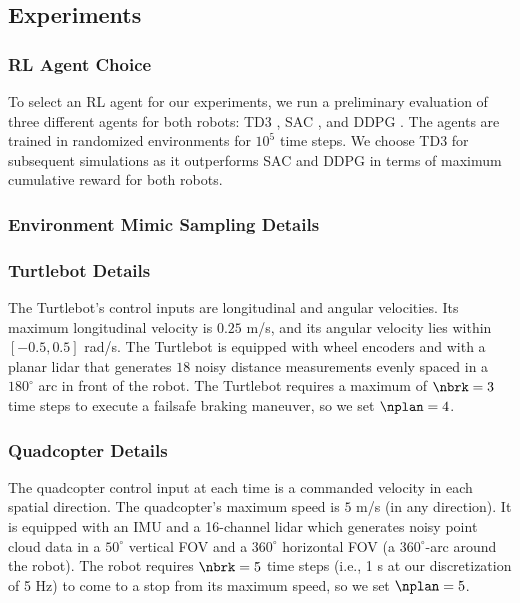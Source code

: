 \subsection{Experiments}

\subsubsection{RL Agent Choice}
To select an RL agent for our experiments, we run a preliminary evaluation of three different agents for both robots: TD3 \cite{conf:TD3}, SAC \cite{conf:SAC}, and DDPG \cite{conf:DDPG}.
The agents are trained in randomized environments for $10^5$ time steps.
We choose TD3 for subsequent simulations as it outperforms SAC and DDPG in terms of maximum cumulative reward for both robots.


\subsubsection{Environment Mimic Sampling Details}



\subsubsection{Turtlebot Details}

The Turtlebot's control inputs are longitudinal and angular velocities.
Its maximum longitudinal velocity is $0.25$ m/s, and its angular velocity lies within $[-0.5, 0.5]$ rad/s.
The Turtlebot is equipped with wheel encoders and with a planar lidar that generates $18$ noisy distance measurements evenly spaced in a $180^\circ$ arc in front of the robot.
The Turtlebot requires a maximum of  $\nbrk = 3$ time steps to execute a failsafe braking maneuver, so we set $\nplan = 4$.


\subsubsection{Quadcopter Details}

The quadcopter control input at each time is a commanded velocity in each spatial direction.
The quadcopter's maximum speed is $5$ m/s (in any direction).
It is equipped with an IMU and a 16-channel lidar which generates noisy point cloud data in a $50^\circ$ vertical FOV and a $360^\circ$ horizontal FOV (a $360^\circ$-arc around the robot). 
The robot requires $\nbrk = 5$ time steps (i.e., 1 s at our discretization of 5 Hz) to come to a stop from its maximum speed, so we set $\nplan = 5$.
